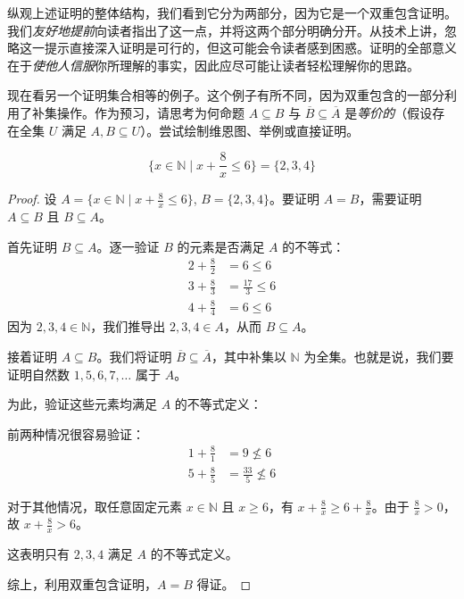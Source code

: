 纵观上述证明的整体结构，我们看到它分为两部分，因为它是一个双重包含证明。我们\emph{友好地提前}向读者指出了这一点，并将这两个部分明确分开。从技术上讲，忽略这一提示直接深入证明是可行的，但这可能会令读者感到困惑。证明的全部意义在于\emph{使他人信服}你所理解的事实，因此应尽可能让读者轻松理解你的思路。

现在看另一个证明集合相等的例子。这个例子有所不同，因为双重包含的一部分利用了补集操作。作为预习，请思考为何命题 $A \subseteq B$ 与 $\overline{B} \subseteq \overline{A}$ 是\emph{等价的}（假设存在全集 $U$ 满足 $A, B \subseteq U$）。尝试绘制维恩图、举例或直接证明。

\begin{proposition}
    \[\Big\{x \in \mathbb{N} \mid x + \frac{8}{x} \le 6\Big\} = \{2, 3, 4\}\]
\end{proposition}

\begin{proof}
    设 $A = \Big\{x \in \mathbb{N} \mid x + \frac{8}{x} \le 6\Big\}$, $B = \{2, 3, 4\}$。要证明 $A = B$，需要证明 $A \subseteq B$ 且 $B \subseteq A$。

    首先证明 $B \subseteq A$。逐一验证 $B$ 的元素是否满足 $A$ 的不等式：
    \begin{align*}
        2 + \frac{8}{2} &= 6 \le 6 \\
        3 + \frac{8}{3} &= \frac{17}{3} \le 6 \\
        4 + \frac{8}{4} &= 6 \le 6
    \end{align*}
    因为 $2,3,4 \in \mathbb{N}$，我们推导出 $2,3,4 \in A$，从而 $B \subseteq A$。

    接着证明 $A \subseteq B$。我们将证明 $\overline{B} \subseteq \overline{A}$，其中补集以 $\mathbb{N}$ 为全集。也就是说，我们要证明自然数 $1,5,6,7,\dots$ 属于 $A$。

    为此，验证这些元素均满足 $A$ 的不等式定义：

    前两种情况很容易验证：
    \begin{align*}
        1 + \frac{8}{1} &= 9 \nleq 6 \\
        5 + \frac{8}{5} &= \frac{33}{5} \nleq 6
    \end{align*}

    对于其他情况，取任意固定元素 $x \in \mathbb{N}$ 且 $x \ge 6$，有 $x + \frac{8}{x} \ge 6 + \frac{8}{x}$。由于 $\frac{8}{x} > 0$，故 $x + \frac{8}{x} > 6$。

    这表明只有 $2,3,4$ 满足 $A$ 的不等式定义。

    综上，利用双重包含证明，$A = B$ 得证。
\end{proof}

